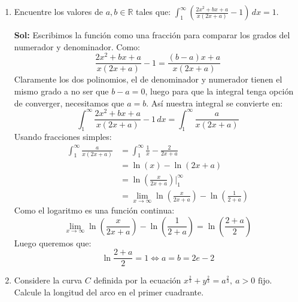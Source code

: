 \documentclass[letterpaper,12pt]{article}
\theoremstyle{plain}
\theoremstyle{definition}
\begin{document}
\begin{enumerate}
\item 
Encuentre los valores de \( a, b \in \mathbb{R} \) tales que:
 $\displaystyle
\int_{1}^{\infty} \left( \frac{2x^2 + bx + a}{x(2x + a)} - 1 \right) \, dx = 1.$

\color{blue}
\textbf{Sol:} Escribimos la función como una fracción para comparar los grados del numerador y denominador. Como:
\[
\frac{2x^2 + bx + a}{x(2x+a)} - 1 = \frac{(b-a)x + a}{x(2x+a)}
\]
Claramente los dos polinomios, el de denominador y numerador tienen el mismo grado a no ser que $b-a = 0$, luego para que la integral tenga opción de converger, necesitamos que $a = b$. Así nuestra integral se convierte en:
\[
\int_{1}^{\infty} \frac{2x^2 + bx + a}{x(2x+a)} - 1 \, dx = \int_{1}^{\infty} \frac{a}{x(2x+a)}
\]
Usando fracciones simples:
\begin{align*}
\int_{1}^{\infty} \frac{a}{x(2x+a)} &= \int_{1}^{\infty} \frac{1}{x} - \frac{2}{2x+a} \\
&= \ln(x) - \ln(2x+a) \\
&= \ln\left(\frac{x}{2x+a}\right) \bigg|_{1}^{\infty} \\
&= \lim_{x\to\infty} \ln\left(\frac{x}{2x+a}\right) - \ln\left(\frac{1}{2+a}\right)
\end{align*}
Como el logaritmo es una función continua:
\[
\lim_{x\to\infty} \ln\left(\frac{x}{2x+a}\right) - \ln\left(\frac{1}{2+a}\right) = \ln\left(\frac{2+a}{2}\right)
\]
Luego queremos que:
\[
\ln \frac{2+a}{2} = 1 \iff a = b = 2e - 2
\] 
\color{black}


\item Considere la curva \( C \) definida por la ecuación
$\displaystyle
x^{\frac{2}{3}} + y^{\frac{2}{3}} = a^{\frac{2}{3}}, \ a > 0 \text{ fijo}.
$ Calcule la longitud del arco en el primer cuadrante.


\end{enumerate}
\end{document}
